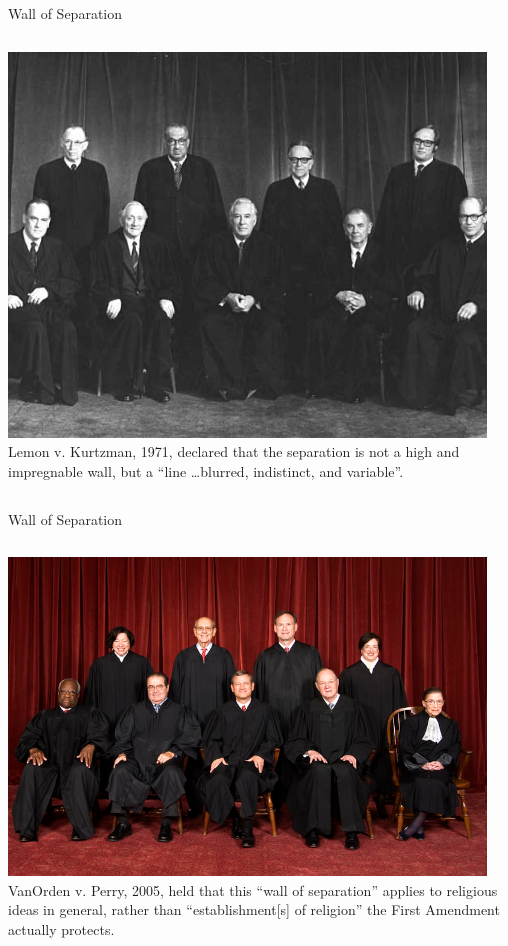 \begin{frame}{Wall of Separation}
    \begin{columns}[onlytextwidth]
            \centering
            \includegraphics[width=0.95\textwidth]{img/supreme-court-1970.jpg} \\

            Lemon v. Kurtzman, 1971, declared that the separation is not a high
            and impregnable wall, but a ``line \ldots blurred, indistinct, and
            variable''.

    \end{columns}
\end{frame}

\begin{frame}{Wall of Separation}
    \begin{columns}[onlytextwidth]
            \centering
            \includegraphics[width=0.95\textwidth]{img/supreme.png} \\

            VanOrden v. Perry, 2005, held that this ``wall of separation''
            applies to religious ideas in general, rather than
            ``establishment[s] of religion'' the First Amendment actually
            protects.

    \end{columns}
\end{frame}

